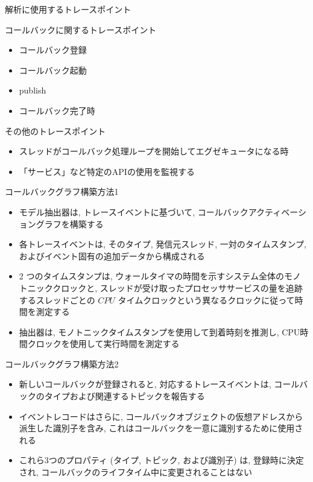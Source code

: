 \begin{frame}{解析に使用するトレースポイント}
    \begin{block}{コールバックに関するトレースポイント}
        \setlength{\linewidth}{0.98\columnwidth}
        \begin{itemize}
            \item コールバック登録
            \item コールバック起動
            \item publish
            \item コールバック完了時
        \end{itemize}
    \end{block}
    \begin{block}{その他のトレースポイント}
        \setlength{\linewidth}{0.98\columnwidth}
        \begin{itemize}
            \item スレッドがコールバック処理ループを開始してエグゼキュータになる時
            \item 「サービス」など特定のAPIの使用を監視する
        \end{itemize}
    \end{block}
\end{frame}

\begin{frame}{コールバックグラフ構築方法1}
    \begin{itemize}
        \item モデル抽出器は, トレースイベントに基づいて, コールバックアクティベーショングラフを構築する
        \item 各トレースイベントは, そのタイプ, 発信元スレッド, 一対のタイムスタンプ, およびイベント固有の追加データから構成される
        \item 2 つのタイムスタンプは, ウォールタイマの時間を示すシステム全体のモノトニッククロックと, スレッドが受け取ったプロセッササービスの量を追跡するスレッドごとの $C P U$ タイムクロックという異なるクロックに従って時間を測定する
        \item 抽出器は, モノトニックタイムスタンプを使用して到着時刻を推測し, CPU時間クロックを使用して実行時間を測定する
    \end{itemize}
\end{frame}

\begin{frame}{コールバックグラフ構築方法2}
    \begin{itemize}
        \item 新しいコールバックが登録されると, 対応するトレースイベントは, コールバックのタイプおよび関連するトピックを報告する
        \item イベントレコードはさらに, コールバックオブジェクトの仮想アドレスから派生した識別子を含み, これはコールバックを一意に識別するために使用される
        \item これら3つのプロパティ (タイプ, トピック, および識別子) は, 登録時に決定され, コールバックのライフタイム中に変更されることはない
    \end{itemize}
\end{frame}

